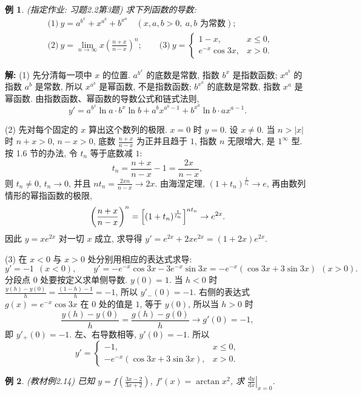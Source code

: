 \documentclass[UTF8,openany]{ctexbook}
\theoremstyle{chinesetextbook}
\newtheorem{example}{例}[section]
\newenvironment{cnsolution}{\par\indent\textbf{解:} \ignorespaces}{\par}
\newcommand{\dd}{\mathrm d}
\begin{document}
\begin{example}\label{ex:c2-h2-3}
\textnormal{(指定作业: 习题2.2第3题)} 求下列函数的导数:
\[
\begin{aligned}
&\text{(1)}\ y=a^{b^x}+x^{a^b}+b^{x^a}\quad(x,a,b>0,\ a,b\text{ 为常数});\\
&\text{(2)}\ y=\lim_{n\to\infty}x\left(\frac{n+x}{n-x}\right)^n;\qquad\text{(3)}\ y=\begin{cases}1-x,&x\le0,\\e^{-x}\cos3x,&x>0.\end{cases}
\end{aligned}
\]
\end{example}
\begin{cnsolution}
(1) 先分清每一项中 $x$ 的位置. $a^{b^x}$ 的底数是常数, 指数 $b^x$ 是指数函数; $x^{a^b}$ 的指数 $a^b$ 是常数, 所以 $x^{a^b}$ 是幂函数, 不是指数函数; $b^{x^a}$ 的底数是常数, 指数 $x^a$ 是幂函数. 由指数函数、幂函数的导数公式和链式法则,
\[
y'=a^{b^x}\ln a\cdot b^x\ln b+a^bx^{a^b-1}+b^{x^a}\ln b\cdot ax^{a-1}.
\]

(2) 先对每个固定的 $x$ 算出这个数列的极限. $x=0$ 时 $y=0$. 设 $x\ne0$. 当 $n>|x|$ 时 $n+x>0$, $n-x>0$, 底数 $\displaystyle\frac{n+x}{n-x}$ 为正并且趋于 $1$, 指数 $n$ 无限增大, 是 $1^\infty$ 型. 按 1.6 节的办法, 令 $t_n$ 等于底数减 $1$:
\[
t_n=\frac{n+x}{n-x}-1=\frac{2x}{n-x},
\]
则 $t_n\ne0$, $t_n\to0$, 并且 $\displaystyle nt_n=\frac{2xn}{n-x}\to2x$. 由海涅定理, $(1+t_n)^{\frac1{t_n}}\to e$, 再由数列情形的幂指函数的极限,
\[
\left(\frac{n+x}{n-x}\right)^n=\Bigl[(1+t_n)^{\frac1{t_n}}\Bigr]^{nt_n}\to e^{2x}.
\]
因此 $y=xe^{2x}$ 对一切 $x$ 成立, 求导得 $y'=e^{2x}+2xe^{2x}=(1+2x)e^{2x}$.

(3) 在 $x<0$ 与 $x>0$ 处分别用相应的表达式求导:
\[
y'=-1\ \ (x<0),\qquad y'=-e^{-x}\cos3x-3e^{-x}\sin3x=-e^{-x}(\cos3x+3\sin3x)\ \ (x>0).
\]
分段点 $0$ 处要按定义求单侧导数. $y(0)=1$. 当 $h<0$ 时 $\displaystyle\frac{y(h)-y(0)}h=\frac{(1-h)-1}h=-1$, 所以 $y'_-(0)=-1$. 右侧的表达式 $g(x)=e^{-x}\cos3x$ 在 $0$ 处的值是 $1$, 等于 $y(0)$, 所以当 $h>0$ 时
\[
\frac{y(h)-y(0)}h=\frac{g(h)-g(0)}h\to g'(0)=-1,
\]
即 $y'_+(0)=-1$. 左、右导数相等, $y'(0)=-1$. 所以
\[
y'=\begin{cases}-1,&x\le0,\\-e^{-x}(\cos3x+3\sin3x),&x>0.\end{cases}
\]
\end{cnsolution}
\begin{example}\label{ex:c2-2-14}
\textnormal{(教材例2.14)} 已知 $\displaystyle y=f\left(\frac{3x-2}{3x+2}\right)$, $f'(x)=\arctan x^2$, 求 $\displaystyle\left.\frac{\dd y}{\dd x}\right|_{x=0}$.
\end{example}
\end{document}
